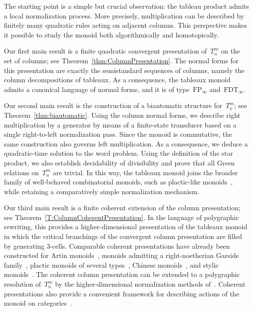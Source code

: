 \documentclass[a4paper, twoside, 11pt, english]{article}
\theoremstyle{plain}
\theoremstyle{definition}
\begin{document}
The starting point is a simple but crucial observation: the tableau product admits a local normalization process. More precisely, multiplication can be described by finitely many quadratic rules acting on adjacent columns. This perspective makes it possible to study the monoid both algorithmically and homotopically.

Our first main result is a finite quadratic convergent presentation of~$T_n^m$ on the set of columns; see Theorem~\ref{thm:ColumnPresentation}. The normal forms for this presentation are exactly the semistandard sequences of columns, namely the column decompositions of tableaux. As a consequence, the tableaux monoid admits a canonical language of normal forms, and it is of type~$\mathrm{FP}_\infty$ and~$\mathrm{FDT}_\infty$.

Our second main result is the construction of a biautomatic structure for~$T_n^m$; see Theorem~\ref{thm:biautomatic}. Using the column normal forms, we describe right multiplication by a generator by means of a finite-state transducer based on a single right-to-left normalization pass. Since the monoid is commutative, the same construction also governs left multiplication.  As a consequence, we deduce a quadratic-time solution to the word problem. Using the definition of the star product, we also establish decidability of divisibility and prove that all Green relations on~$T_n^m$ are trivial. In this way, the tableaux monoid joins the broader family of well-behaved combinatorial monoids, such as plactic-like monoids~\cite{CainGrayMalheiro15,CainGrayMalheiro19,CainGrayMalheiro15b}, while retaining a comparatively simple normalization mechanism.

Our third main result is a finite coherent extension of the column presentation; see Theorem~\ref{T:ColumnCoherentPresentation}. In the language of polygraphic rewriting, this provides a higher-dimensional presentation of the tableaux monoid in which the critical branchings of the convergent column presentation are filled by generating $3$-cells. Comparable coherent presentations have already been constructed for Artin monoids~\cite{GaussentGuiraudMalbos15}, monoids admitting a right-noetherian Garside family~\cite{CurienDuricGuiraud23}, plactic monoids of several types~\cite{HageMalbos17, Meha2021}, Chinese monoids~\cite{HageMalbos22}, and stylic monoids~\cite{hage2026coherent}. The coherent column presentation can be extended to a polygraphic resolution of~$T_n^m$ by the higher-dimensional
normalization methods of~\cite{GuiraudMalbos12advances}. Coherent presentations also provide a convenient framework for describing actions of the monoid on categories~\cite{GaussentGuiraudMalbos15}.
\end{document}
